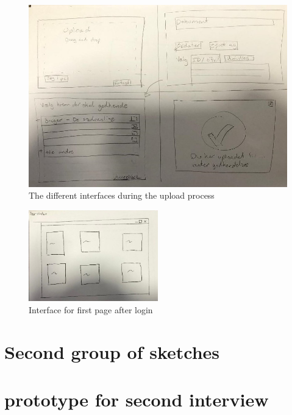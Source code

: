 \begin{figure}[H]
	\centering
		\includegraphics[width=\textwidth]{billeder/Upload-view.jpg}
		\caption{The different interfaces during the upload process}
		\label{fig:1-Upload}
\end{figure}

\begin{figure}[H]
	\centering
	\includegraphics[width=0.5\textwidth]{billeder/app-view.jpg}
	\caption{Interface for first page after login}
	\label{fig:1-app-view}
\end{figure}

\section{Second group of sketches}

\section{prototype for second interview}